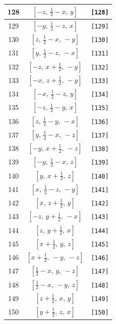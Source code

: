 \documentclass[fleqn,8pt]{jsarticle}
\begin{document}
\begin{longtable}{ccc}
128 & $\left[ - z,\, \frac{1}{2} - x,\, y \right]$ & {\tt [128]} \\ \hline
129 & $\left[ - y,\, \frac{1}{2} - z,\, x \right]$ & {\tt [129]} \\ \hline
130 & $\left[ z,\, \frac{1}{2} - x,\, - y \right]$ & {\tt [130]} \\ \hline
131 & $\left[ y,\, \frac{1}{2} - z,\, - x \right]$ & {\tt [131]} \\ \hline
132 & $\left[ - z,\, x + \frac{1}{2},\, - y \right]$ & {\tt [132]} \\ \hline
133 & $\left[ - x,\, z + \frac{1}{2},\, - y \right]$ & {\tt [133]} \\ \hline
134 & $\left[ - x,\, \frac{1}{2} - z,\, y \right]$ & {\tt [134]} \\ \hline
135 & $\left[ - z,\, \frac{1}{2} - y,\, x \right]$ & {\tt [135]} \\ \hline
136 & $\left[ z,\, \frac{1}{2} - y,\, - x \right]$ & {\tt [136]} \\ \hline
137 & $\left[ y,\, \frac{1}{2} - x,\, - z \right]$ & {\tt [137]} \\ \hline
138 & $\left[ - y,\, x + \frac{1}{2},\, - z \right]$ & {\tt [138]} \\ \hline
139 & $\left[ - y,\, \frac{1}{2} - x,\, z \right]$ & {\tt [139]} \\ \hline
140 & $\left[ y,\, x + \frac{1}{2},\, z \right]$ & {\tt [140]} \\ \hline
141 & $\left[ x,\, \frac{1}{2} - z,\, - y \right]$ & {\tt [141]} \\ \hline
142 & $\left[ x,\, z + \frac{1}{2},\, y \right]$ & {\tt [142]} \\ \hline
143 & $\left[ - z,\, y + \frac{1}{2},\, - x \right]$ & {\tt [143]} \\ \hline
144 & $\left[ z,\, y + \frac{1}{2},\, x \right]$ & {\tt [144]} \\ \hline
145 & $\left[ x + \frac{1}{2},\, y,\, z \right]$ & {\tt [145]} \\ \hline
146 & $\left[ x + \frac{1}{2},\, - y,\, - z \right]$ & {\tt [146]} \\ \hline
147 & $\left[ \frac{1}{2} - x,\, y,\, - z \right]$ & {\tt [147]} \\ \hline
148 & $\left[ \frac{1}{2} - x,\, - y,\, z \right]$ & {\tt [148]} \\ \hline
149 & $\left[ z + \frac{1}{2},\, x,\, y \right]$ & {\tt [149]} \\ \hline
150 & $\left[ y + \frac{1}{2},\, z,\, x \right]$ & {\tt [150]} \\ \hline

\end{longtable}
\end{document}
